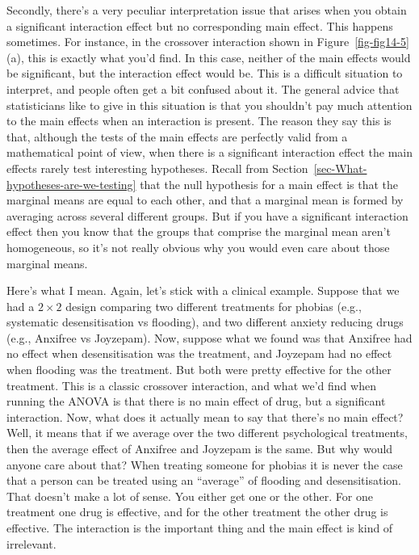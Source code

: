\documentclass[
  a4paper,
]{book}
\begin{document}
Secondly, there's a very peculiar interpretation issue that arises when
you obtain a significant interaction effect but no corresponding main
effect. This happens sometimes. For instance, in the crossover
interaction shown in Figure~\ref{fig-fig14-5}(a), this is exactly what
you'd find. In this case, neither of the main effects would be
significant, but the interaction effect would be. This is a difficult
situation to interpret, and people often get a bit confused about it.
The general advice that statisticians like to give in this situation is
that you shouldn't pay much attention to the main effects when an
interaction is present. The reason they say this is that, although the
tests of the main effects are perfectly valid from a mathematical point
of view, when there is a significant interaction effect the main effects
rarely test interesting hypotheses. Recall from
Section~\ref{sec-What-hypotheses-are-we-testing} that the null
hypothesis for a main effect is that the marginal means are equal to
each other, and that a marginal mean is formed by averaging across
several different groups. But if you have a significant interaction
effect then you know that the groups that comprise the marginal mean
aren't homogeneous, so it's not really obvious why you would even care
about those marginal means.

Here's what I mean. Again, let's stick with a clinical example. Suppose
that we had a \(2 \times 2\) design comparing two different treatments
for phobias (e.g., systematic desensitisation vs flooding), and two
different anxiety reducing drugs (e.g., Anxifree vs Joyzepam). Now,
suppose what we found was that Anxifree had no effect when
desensitisation was the treatment, and Joyzepam had no effect when
flooding was the treatment. But both were pretty effective for the other
treatment. This is a classic crossover interaction, and what we'd find
when running the ANOVA is that there is no main effect of drug, but a
significant interaction. Now, what does it actually mean to say that
there's no main effect? Well, it means that if we average over the two
different psychological treatments, then the average effect of Anxifree
and Joyzepam is the same. But why would anyone care about that? When
treating someone for phobias it is never the case that a person can be
treated using an ``average'' of flooding and desensitisation. That
doesn't make a lot of sense. You either get one or the other. For one
treatment one drug is effective, and for the other treatment the other
drug is effective. The interaction is the important thing and the main
effect is kind of irrelevant.
\end{document}
